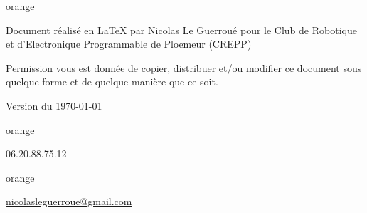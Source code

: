 
\begin{items}{orange}{\Triangle}
    \item Document réalisé en \LaTeX{} par Nicolas Le Guerroué 
    pour le Club de Robotique et d'Electronique Programmable de Ploemeur (CREPP) 
    \item Permission vous est donnée de copier, distribuer et/ou modifier ce document sous quelque forme et de quelque manière que ce soit.
    \item Version du \today
    \end{items}
    
    
    \begin{items}{orange}{\faPhone}
        \item 06.20.88.75.12
    \end{items}
    
    \begin{items}{orange}{\faEnvelope}
        \item \href{mailto:nicolasleguerroue@gmail.com}{nicolasleguerroue@gmail.com}
    \end{items}
    